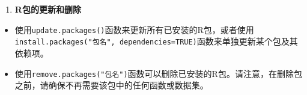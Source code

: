 \documentclass[
]{book}
\providecommand{\tightlist}{%
  \setlength{\itemsep}{0pt}\setlength{\parskip}{0pt}}
\begin{document}
\begin{enumerate}
\def\labelenumi{\arabic{enumi}.}
\setcounter{enumi}{3}
\tightlist
\item
  \textbf{R包的更新和删除}
\end{enumerate}

\begin{itemize}
\tightlist
\item
  使用\texttt{update.packages()}函数来更新所有已安装的R包，或者使用\texttt{install.packages("包名",\ dependencies=TRUE)}函数来单独更新某个包及其依赖项。
\item
  使用\texttt{remove.packages("包名")}函数可以删除已安装的R包。请注意，在删除包之前，请确保不再需要该包中的任何函数或数据集。
\end{itemize}

  
\end{document}
